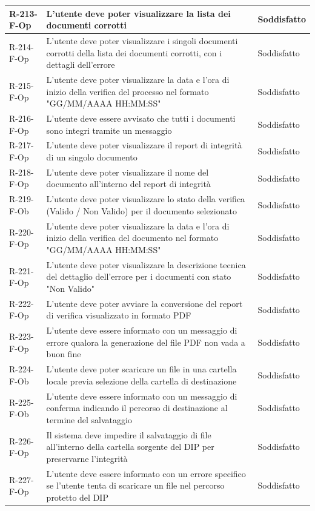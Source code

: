\begin{longtable}{|p{2.5cm}|p{9.5cm}|p{2.5cm}|}
\hline
R-213-F-Op & L'utente deve poter visualizzare la lista dei documenti corrotti & Soddisfatto \\
\hline
R-214-F-Op & L'utente deve poter visualizzare i singoli documenti corrotti della lista dei documenti corrotti, con i dettagli dell'errore & Soddisfatto \\
\hline
R-215-F-Op & L'utente deve poter visualizzare la data e l'ora di inizio della verifica del processo nel formato "GG/MM/AAAA HH:MM:SS" & Soddisfatto \\
\hline
R-216-F-Op & L'utente deve essere avvisato che tutti i documenti sono integri tramite un messaggio & Soddisfatto \\
\hline
R-217-F-Op & L'utente deve poter visualizzare il report di integrità di un singolo documento & Soddisfatto \\
\hline
R-218-F-Op & L'utente deve poter visualizzare il nome del documento all'interno del report di integrità & Soddisfatto \\
\hline
R-219-F-Ob & L'utente deve poter visualizzare lo stato della verifica (Valido / Non Valido) per il documento selezionato & Soddisfatto \\
\hline
R-220-F-Op & L'utente deve poter visualizzare la data e l'ora di inizio della verifica del documento nel formato "GG/MM/AAAA HH:MM:SS" & Soddisfatto \\
\hline
R-221-F-Op & L'utente deve poter visualizzare la descrizione tecnica del dettaglio dell'errore per i documenti con stato "Non Valido" & Soddisfatto \\
\hline
R-222-F-Op & L'utente deve poter avviare la conversione del report di verifica visualizzato in formato PDF & Soddisfatto \\
\hline
R-223-F-Op & L'utente deve essere informato con un messaggio di errore qualora la generazione del file PDF non vada a buon fine & Soddisfatto \\
\hline
R-224-F-Ob & L'utente deve poter scaricare un file in una cartella locale previa selezione della cartella di destinazione & Soddisfatto \\
\hline
R-225-F-Ob & L'utente deve essere informato con un messaggio di conferma indicando il percorso di destinazione al termine del salvataggio & Soddisfatto \\
\hline
R-226-F-Op & Il sistema deve impedire il salvataggio di file all'interno della cartella sorgente del DIP per preservarne l'integrità & Soddisfatto \\
\hline
R-227-F-Op & L'utente deve essere informato con un errore specifico se l'utente tenta di scaricare un file nel percorso protetto del DIP & Soddisfatto \\

\end{longtable}
